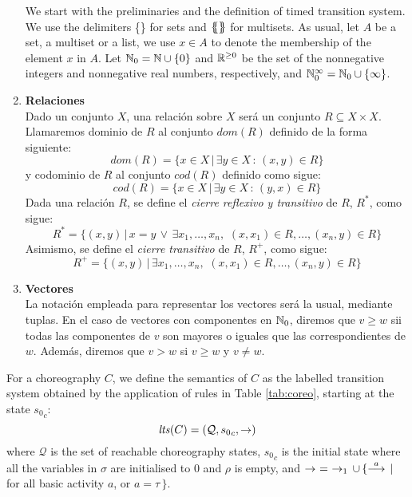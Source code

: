 \begin{enumerate}
We start with the preliminaries and the definition of timed transition system. 
We use the delimiters \{\} for sets and $\mathit{\{\!\!\{\}\!\!\}}$ for multisets.
As usual, let $A$ be a set, a multiset or a list, 
we use $x \in A$ to denote the membership of the element  $x$ in $A$. 
Let $\mathbb{N}_{0} = \mathbb{N} \cup \{0\}$ and $\mathbb{R}^{\geq 0}$ be the set of the 
nonnegative integers and nonnegative real numbers, respectively,
and $\mathbb{N}_{0}^{\infty} = \mathbb{N}_{0} \cup \left\{\infty \right\}$. 
\item {\bf Relaciones}\\
Dado un conjunto $X$, una relaci\'{o}n sobre
$X$ ser\'{a} un conjunto $R \subseteq X \times X$. Llamaremos
dominio de $R$ al conjunto $dom(R)$ definido de la forma
siguiente:
\[dom(R) = \{ x \in X \,|\, \exists
y \in X\,:\, (x,y) \in R \}\]
y codominio de $R$ al conjunto $cod(R)$ definido como sigue:
\[cod(R) = \{ x \in X \,|\, \exists y \in X\,:\,(y,x) \in R\}\]
Dada una relaci\'{o}n $R$, se define el {\it cierre reflexivo y transitivo} de
$R$, $R^*$, como sigue:
\[ R^* = \{ (x,y)\,|\,x=y \,\vee\,
\exists x_1,\ldots,x_n,\,\,(x,x_1)\in R,\ldots,(x_n,y) \in R\}\]
Asimismo, se define el {\it cierre
transitivo} de $R$, $R^+$, como sigue:
\[R^+ = \{ (x,y)\,|\,
\exists x_1,\ldots,x_n,\,\,(x,x_1)\in R,\ldots,(x_n,y) \in R\}\]
\item {\bf Vectores}\\
La notaci\'{o}n empleada para representar los vectores
ser\'{a} la usual, mediante tuplas. En el caso de vectores con componentes
en $\mathbb{N}_{0}$, diremos que $v \geq w$ sii todas las componentes de $v$
son mayores o iguales que las correspondientes de $w$. Adem\'{a}s,
diremos que $v > w$ si $v \geq w$ y $v \neq w$.
\end{enumerate}

\begin{definition}

For a choreography $C$, we define the
semantics of $C$ as the labelled transition system
obtained by the application of rules in Table \ref{tab:coreo}, starting at the state ${s_0}_c$:
\[
  {\it lts}(C) = (\mathcal{Q}, {s_0}_c,  \rightarrow)
\]
%
\noindent
where $\mathcal{Q}$ is the set of reachable choreography states, ${s_0}_c$ is the initial state where all the variables in $\sigma$ are initialised to 0 and $\rho$ is empty, and
$\rightarrow \,\,= \,\,\rightarrow_1 \,\cup\, \{ \stackrel{a}{\longrightarrow}\,|\,$
for all basic activity $a$, or $a=\tau \,\}$.
\vspace{0.1cm}
\end{definition}

